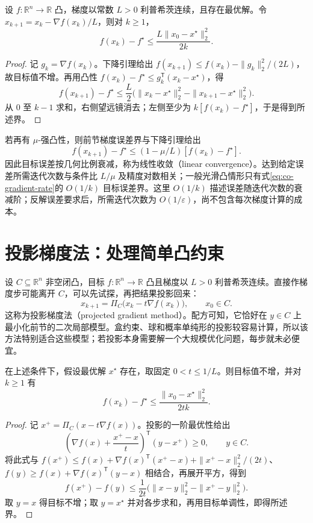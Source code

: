 \begin{theorem}[光滑凸情形的目标误差界]
设 $f:\mathbb R^n\to\mathbb R$ 凸，梯度以常数 $L>0$ 利普希茨连续，且存在最优解。令 $x_{k+1}=x_k-\nabla f(x_k)/L$，则对 $k\geq1$，
\begin{equation}
 f(x_k)-f^\star\leq\frac{L\|x_0-x^\star\|_2^2}{2k}.
 \label{eq:co-gradient-rate}
\end{equation}
\end{theorem}
\begin{proof}
记 $g_k=\nabla f(x_k)$。下降引理给出 $f(x_{k+1})\leq f(x_k)-\|g_k\|_2^2/(2L)$，故目标值不增。再用凸性 $f(x_k)-f^\star\leq g_k^{\mathsf T}(x_k-x^\star)$，得
\[
 f(x_{k+1})-f^\star
 \leq\frac L2\bigl(\|x_k-x^\star\|_2^2-\|x_{k+1}-x^\star\|_2^2\bigr).
\]
从 $0$ 至 $k-1$ 求和，右侧望远镜消去；左侧至少为 $k[f(x_k)-f^\star]$，于是得到所述界。
\end{proof}

若再有 $\mu$-强凸性，则前节梯度误差界与下降引理给出
\[
 f(x_{k+1})-f^\star\leq(1-\mu/L)[f(x_k)-f^\star].
\]
因此目标误差按几何比例衰减，称为线性收敛（linear convergence）。达到给定误差所需迭代次数与条件比 $L/\mu$ 及精度对数相关；一般光滑凸情形只有式\eqref{eq:co-gradient-rate}的 $O(1/k)$ 目标误差界。这里 $O(1/k)$ 描述误差随迭代次数的衰减阶；反解误差要求后，所需迭代次数为 $O(1/\varepsilon)$，尚不包含每次梯度计算的成本。

\section{投影梯度法：处理简单凸约束}
\label{sec:co-projected-gradient}

设 $C\subseteq\mathbb R^n$ 非空闭凸，目标 $f:\mathbb R^n\to\mathbb R$ 凸且梯度以 $L>0$ 利普希茨连续。直接作梯度步可能离开 $C$，可以先试探，再把结果投影回来：
\begin{equation}
 x_{k+1}=\Pi_C\bigl(x_k-t\nabla f(x_k)\bigr),\qquad x_0\in C.
 \label{eq:co-projected-gradient}
\end{equation}
这称为投影梯度法（projected gradient method）。配方可知，它恰好在 $y\in C$ 上最小化前节的二次局部模型。盒约束、球和概率单纯形的投影较容易计算，所以该方法特别适合这些模型；若投影本身需要解一个大规模优化问题，每步就未必便宜。

\begin{proposition}[投影梯度法的下降与误差界]
在上述条件下，假设最优解 $x^\star$ 存在，取固定 $0<t\leq1/L$。则目标值不增，并对 $k\geq1$ 有
\[
 f(x_k)-f^\star\leq\frac{\|x_0-x^\star\|_2^2}{2tk}.
\]
\end{proposition}
\begin{proof}
记 $x^+=\Pi_C(x-t\nabla f(x))$。投影的一阶最优性给出
\[
 \left(\nabla f(x)+\frac{x^+-x}{t}\right)^{\mathsf T}(y-x^+)\geq0,
 \qquad y\in C.
\]
将此式与 $f(x^+)\leq f(x)+\nabla f(x)^{\mathsf T}(x^+-x)+\|x^+-x\|_2^2/(2t)$、$f(y)\geq f(x)+\nabla f(x)^{\mathsf T}(y-x)$ 相结合，再展开平方，得到
\begin{equation}
 f(x^+)-f(y)\leq\frac1{2t}
 \bigl(\|x-y\|_2^2-\|x^+-y\|_2^2\bigr).
 \label{eq:co-projected-three-point}
\end{equation}
取 $y=x$ 得目标不增；取 $y=x^\star$ 并对各步求和，再用目标单调性，即得所述界。
\end{proof}

